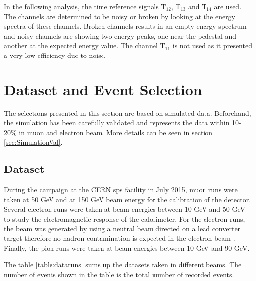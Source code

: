 In the following analysis, the time reference signals T$_{12}$, T$_{13}$ and T$_{14}$ are used. The channels are determined to be noisy or broken by looking at the energy spectra of these channels. Broken channels results in an empty energy spectrum and noisy channels are showing two energy peaks, one near the pedestal and another at the expected energy value. The channel T$_{11}$ is not used as it presented a very low efficiency due to noise.

\section{Dataset and Event Selection}

The selections presented in this section are based on simulated data. Beforehand, the simulation has been carefully validated and represents the data within 10-20\% in muon and electron beam. More details can be seen in section \ref{sec:SimulationVal}.

\subsection{Dataset}
\label{subsec:dataset}

During the campaign at the CERN \acrshort{sps} facility in July 2015, muon runs were taken at 50 GeV and at 150 GeV beam energy for the calibration of the detector. Several electron runs were taken at beam energies between 10 GeV and 50 GeV to study the electromagnetic response of the calorimeter. For the electron runs, the beam was generated by using a neutral beam directed on a lead converter target therefore no hadron contamination is expected in the electron beam \cite{H2Beamline}. Finally, the pion runs were taken at beam energies between 10 GeV and 90 GeV.

The table \ref{table:dataruns} sums up the datasets taken in different beams. The number of events shown in the table is the total number of recorded events.

